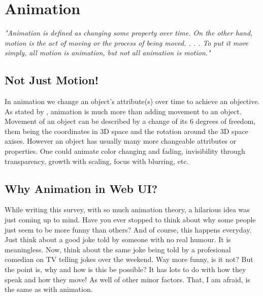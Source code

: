 %
%
% 
% 
% 


\chapter{Animation}

\label{chap:Animation}

{\em"Animation is defined as changing some property over time. On the other hand, motion is the act of moving or the process of being moved. . . .  To put it more simply, all motion is animation, but not all animation is motion."}\citep{head2016designing}

\section{Not Just Motion!} %
\label{sec:anime_motion}

In animation we change an object’s attribute(s) over time to achieve an objective. As stated by \citet{head2016designing}, animation is much more than adding movement to an object. Movement of an object can be described by a change of its 6 degrees of freedom, them being the coordinates in 3D space and the rotation around the 3D space axises. However an object has usually many more changeable attributes or properties. One could animate color changing and fading, invisibility through transparency, growth with scaling, focus with blurring, etc.

\section{Why Animation in Web UI?} %
\label{sec:anime_why}


While writing this survey, with so much animation theory, a hilarious idea was just coming up to mind. Have you ever stopped to think about why some people just seem to be more funny than others? And of course, this happens everyday. Just think about a good joke told by someone with no real humour. It is meaningless. Now, think about the same joke being told by a profesional comedian on TV telling jokes over the weekend. Way more funny, is it not? But the point is, why and how is this be possible?
It has lots to do with how they speak and how they move! As well of other minor factors. That, I am afraid, is the same as with animation. 

